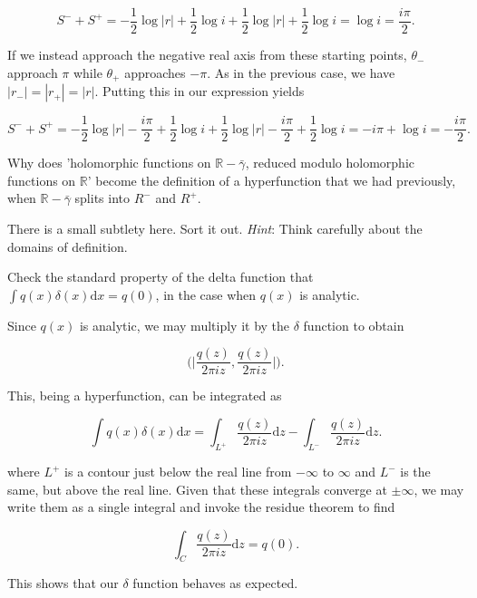 \documentclass[../the-road-to-reality.tex]{subfiles}
\begin{document}
\begin{questions}
\begin{solution}
	\[
	S^{-} + S^{+} = -\frac{1}{2}\log|r| + \frac{1}{2}\log{i} + \frac{1}{2}\log|r| + \frac{1}{2}\log{i} = \log{i} = \frac{i\pi}{2}
	.\] 

	If we instead approach the negative real axis from these starting points, $\theta_{-}$ approach $\pi$ while $\theta_{+}$ approaches $-\pi$. As in the previous case, we have $|r_{-}| = |r_{+}| = |r|$. Putting this in our expression yields

	\[
	S^{-} + S^{+} = -\frac{1}{2}\log|r| - \frac{i\pi}{2} + \frac{1}{2}\log{i} + \frac{1}{2}\log|r| - \frac{i\pi}{2} + \frac{1}{2}\log{i} = -i\pi + \log{i} = -\frac{i\pi}{2}
	.\] 
\end{solution}

\question Why does 'holomorphic functions on $\mathbb{R} - \bar\gamma$, reduced modulo holomorphic functions on $\mathbb{R}$' become the definition of a hyperfunction that we had previously, when $\mathbb{R} - \bar\gamma$ splits into $R^{-}$ and $R^{+}$.

\question There is a small subtlety here. Sort it out. \textit{Hint}: Think carefully about the domains of definition.

\question Check the standard property of the delta function that $\int{q(x)}\delta(x)\mathrm{d}x = q(0)$, in the case when $q(x)$ is analytic.

\begin{solution}
	Since $q(x)$ is analytic, we may multiply it by the $\delta$ function to obtain
	
	\[
	\Big(\!\!\big|\frac{q(z)}{2\pi{i}z}, \frac{q(z)}{2\pi{i}z}\big|\!\!\Big)
	.\] 	

	This, being a hyperfunction, can be integrated as
	
	\[
	\int{q(x)}\delta(x)\mathrm{d}x = \int_{L^+}\frac{q(z)}{2\pi{i}z}\mathrm{d}z - \int_{L^-}\frac{q(z)}{2\pi{i}z}\mathrm{d}z
	.\] 	

	where $L^{+}$ is a contour just below the real line from $-\infty$ to $\infty$ and $L^{-}$ is the same, but above the real line. Given that these integrals converge at $\pm\infty$, we may write them as a single integral and invoke the residue theorem to find

	\[
	\int_{C}\frac{q(z)}{2\pi{i}z}\mathrm{d}z = q(0)
	.\]  

	This shows that our $\delta$ function behaves as expected.
\end{solution}

\end{questions}
	
\end{document}

